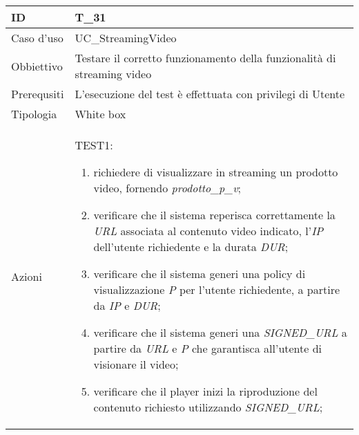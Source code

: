 \begin{table}[hb]
    \centering
    \begin{tabular}{ |p{2cm}|p{10cm}|  }
        \hline
        ID          & T\_31                                                                   \\\hline
        Caso d'uso  & UC\_StreamingVideo                                                      \\\hline
        Obbiettivo  & Testare il corretto funzionamento della funzionalità di streaming video \\\hline
        Prerequsiti & L'esecuzione del test è effettuata con privilegi di Utente              \\\hline
        Tipologia   & White box                                                               \\\hline
        Azioni      &
        TEST1:
        \begin{enumerate}[nosep, topsep=0pt]
            \item richiedere di visualizzare in streaming un prodotto video, fornendo \emph{prodotto\_p\_v};
            \item verificare che il sistema reperisca correttamente la \emph{URL} associata al contenuto video indicato, l'\emph{IP} dell'utente richiedente e la durata \emph{DUR};
            \item verificare che il sistema generi una policy di visualizzazione \emph{P} per l'utente richiedente, a partire da \emph{IP} e \emph{DUR};
            \item verificare che il sistema generi una \emph{SIGNED\_URL} a partire da \emph{URL} e \emph{P} che garantisca all'utente di visionare il video;
            \item verificare che il player inizi la riproduzione del contenuto richiesto utilizzando \emph{SIGNED\_URL};
        \end{enumerate}
        \\\hline
    \end{tabular}
\end{table}

